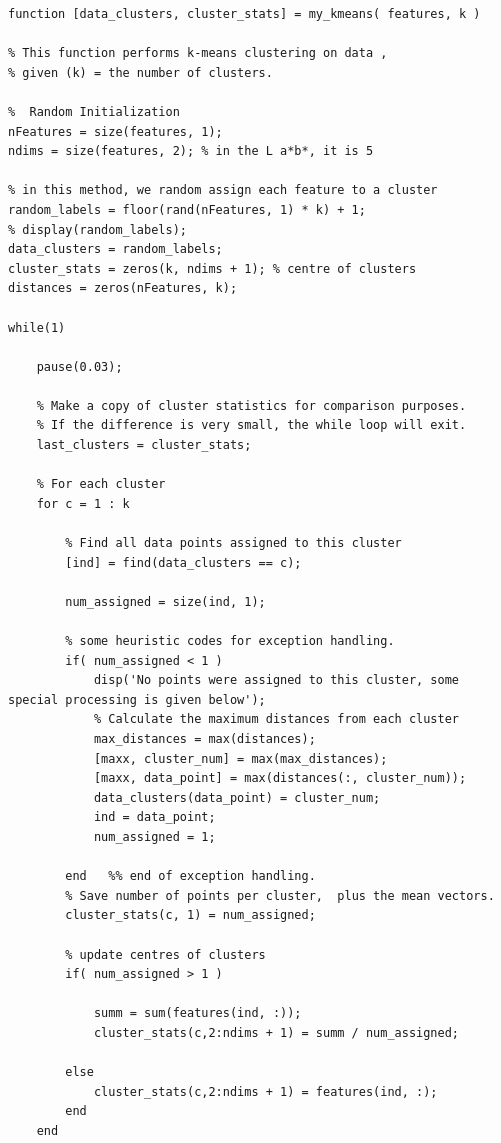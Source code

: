 \documentclass[12pt]{article}
\begin{document}
\begin{lstlisting}
function [data_clusters, cluster_stats] = my_kmeans( features, k )

% This function performs k-means clustering on data ,   
% given (k) = the number of clusters.

%  Random Initialization
nFeatures = size(features, 1);
ndims = size(features, 2); % in the L a*b*, it is 5

% in this method, we random assign each feature to a cluster
random_labels = floor(rand(nFeatures, 1) * k) + 1;
% display(random_labels);
data_clusters = random_labels;
cluster_stats = zeros(k, ndims + 1); % centre of clusters
distances = zeros(nFeatures, k);

while(1)
    
    pause(0.03);
    
    % Make a copy of cluster statistics for comparison purposes.  
    % If the difference is very small, the while loop will exit.
    last_clusters = cluster_stats;
    
    % For each cluster    
    for c = 1 : k
        
        % Find all data points assigned to this cluster
        [ind] = find(data_clusters == c);
        
        num_assigned = size(ind, 1);
        
        % some heuristic codes for exception handling. 
        if( num_assigned < 1 )
            disp('No points were assigned to this cluster, some special processing is given below');
            % Calculate the maximum distances from each cluster
            max_distances = max(distances);
            [maxx, cluster_num] = max(max_distances);
            [maxx, data_point] = max(distances(:, cluster_num));
            data_clusters(data_point) = cluster_num;
            ind = data_point;
            num_assigned = 1;
            
        end   %% end of exception handling.   
        % Save number of points per cluster,  plus the mean vectors.
        cluster_stats(c, 1) = num_assigned;
        
        % update centres of clusters
        if( num_assigned > 1 )
            
            summ = sum(features(ind, :));
            cluster_stats(c,2:ndims + 1) = summ / num_assigned;
            
        else
            cluster_stats(c,2:ndims + 1) = features(ind, :);
        end
    end
    

\end{lstlisting}
\end{document}
